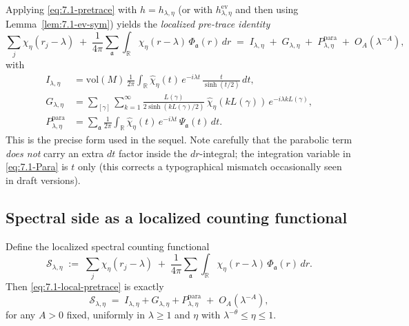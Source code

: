 Applying \eqref{eq:7.1-pretrace} with $h=h_{\lambda,\eta}$ (or with $h^{\mathrm{ev}}_{\lambda,\eta}$ and then using Lemma~\ref{lem:7.1-ev-sym}) yields the \emph{localized pre-trace identity}
\begin{equation}\label{eq:7.1-local-pretrace}
  \sum_{j} \chi_\eta(r_j-\lambda)
  \;+\; \frac{1}{4\pi}\sum_{\mathfrak{a}}\int_{\mathbb{R}}
      \chi_\eta(r-\lambda)\, \Phi_{\mathfrak{a}}(r)\, dr
  \;=\; I_{\lambda,\eta} \;+\; G_{\lambda,\eta} \;+\; P_{\lambda,\eta}^{\mathrm{para}} \;+\; O_A(\lambda^{-A}),
\end{equation}
with
\begin{align}
  I_{\lambda,\eta}
  &= \mathrm{vol}(M)\,\frac{1}{2\pi}\int_{\mathbb{R}}
      \widehat{\chi}_\eta(t)\, e^{-i\lambda t}\,
      \frac{t}{\sinh(t/2)}\, dt, \label{eq:7.1-Id}\\
  G_{\lambda,\eta}
  &= \sum_{[\gamma]}\sum_{k=1}^{\infty}
      \frac{L(\gamma)}{2\sinh(k L(\gamma)/2)}\,
      \widehat{\chi}_\eta(k L(\gamma))\,
      e^{-i \lambda k L(\gamma)}, \label{eq:7.1-Geo}\\
  P_{\lambda,\eta}^{\mathrm{para}}
  &= \sum_{\mathfrak{a}} \frac{1}{2\pi}\int_{\mathbb{R}}
      \widehat{\chi}_\eta(t)\, e^{-i\lambda t}\,
      \Psi_{\mathfrak{a}}(t)\, dt. \label{eq:7.1-Para}
\end{align}
This is the precise form used in the sequel. Note carefully that the parabolic term \emph{does not} carry an extra $dt$ factor inside the $dr$-integral; the integration variable in \eqref{eq:7.1-Para} is $t$ only (this corrects a typographical mismatch occasionally seen in draft versions).

\subsection{Spectral side as a localized counting functional} \label{subsec:7.1-spectral-functional}

Define the localized spectral counting functional
\begin{equation}\label{eq:7.1-spectral-side}
  \mathcal{S}_{\lambda,\eta}
  \;:=\; \sum_{j} \chi_\eta(r_j-\lambda)
          \;+\; \frac{1}{4\pi}\sum_{\mathfrak{a}}\int_{\mathbb{R}}
                 \chi_\eta(r-\lambda)\, \Phi_{\mathfrak{a}}(r)\, dr.
\end{equation}
Then \eqref{eq:7.1-local-pretrace} is exactly
\begin{equation}\label{eq:7.1-equality}
  \mathcal{S}_{\lambda,\eta}
  \;=\; I_{\lambda,\eta} + G_{\lambda,\eta} + P_{\lambda,\eta}^{\mathrm{para}} \;+\; O_A(\lambda^{-A}),
\end{equation}
for any $A>0$ fixed, uniformly in $\lambda\ge 1$ and $\eta$ with $\lambda^{-\theta}\le \eta\le 1$.

